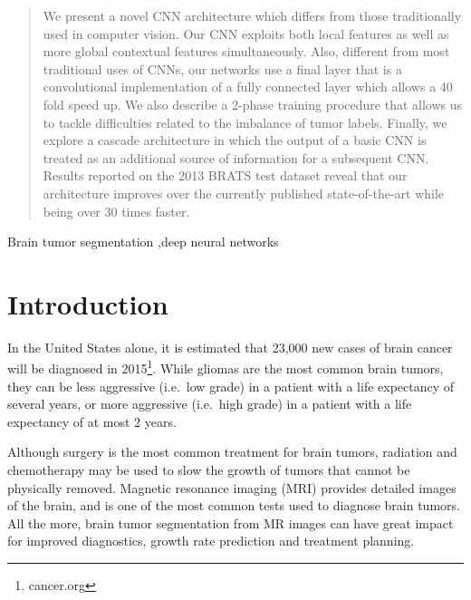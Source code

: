 \documentclass[final,5p,times,twocolumn]{elsarticle}
\begin{document}
\begin{frontmatter}
\begin{abstract}
  We present a novel CNN architecture which differs from those traditionally used in computer vision.  Our CNN exploits both local features as well as more global contextual features simultaneously.  Also, different from most traditional uses of CNNs, our networks use a final layer that is a convolutional implementation of a fully connected layer which allows a 40 fold speed up. We also describe a 2-phase training procedure that allows us to tackle difficulties related to the imbalance of tumor labels. Finally, we explore a cascade architecture in which the output of a basic CNN is treated as an additional source of information for a subsequent CNN. Results reported on the 2013 BRATS test dataset reveal that our architecture improves over the currently published state-of-the-art while being over 30 times faster.

\end{abstract}



\begin{keyword}



Brain tumor segmentation \sep deep neural networks



\end{keyword}



\end{frontmatter}



\section{Introduction}


In the United States alone, it is estimated that 23,000 new cases of brain cancer will be diagnosed in 2015\footnote{cancer.org}. While gliomas are the most common brain tumors, they can be less aggressive (i.e.\ low grade) in a patient with a life expectancy of several years, or more aggressive (i.e.\ high grade) in a patient with a life expectancy of at most 2 years.



Although surgery is the most common treatment for brain tumors, radiation and chemotherapy may be used to slow the growth of tumors that cannot be physically removed. Magnetic resonance imaging (MRI) provides detailed images of the brain, and is one of the most common tests used to diagnose brain tumors. All the more, brain tumor segmentation from MR images can have great impact for improved diagnostics, growth rate prediction and treatment planning.
\end{document}
